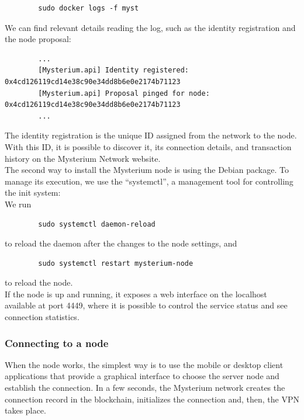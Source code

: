 \documentclass[12pt]{article}
\begin{document}
	\begin{verbatim}
		sudo docker logs -f myst
	\end{verbatim}
	
	We can find relevant details reading the log, such as the identity registration and the node proposal:
	\begin{verbatim}
		...
		[Mysterium.api] Identity registered: 0x4cd126119cd14e38c90e34dd8b6e0e2174b71123
		[Mysterium.api] Proposal pinged for node: 0x4cd126119cd14e38c90e34dd8b6e0e2174b71123
		...
	\end{verbatim}

	The identity registration is the unique ID assigned from the network to the node. With this ID, it is possible to discover it, its connection details, and transaction history on the Mysterium Network website.\\
	
	
	The second way to install the Mysterium node is using the Debian package. To manage its execution, we use the ``systemctl'', a management tool for controlling the init system:\\
	We run 

	\begin{verbatim}
		sudo systemctl daemon-reload
	\end{verbatim}

	to reload the daemon after the changes to the node settings, and 
	
	\begin{verbatim}
		sudo systemctl restart mysterium-node
	\end{verbatim}
	
	to reload the node.\\

	If the node is up and running, it exposes a web interface on the localhost available at port 4449, where it is possible to control the service status and see connection statistics.
	
	\subsubsection{Connecting to a node}

	When the node works, the simplest way is to use the mobile or desktop client applications that provide a graphical interface to choose the server node and establish the connection. In a few seconds, the Mysterium network creates the connection record in the blockchain, initializes the connection and, then, the VPN takes place.\\
\end{document}
